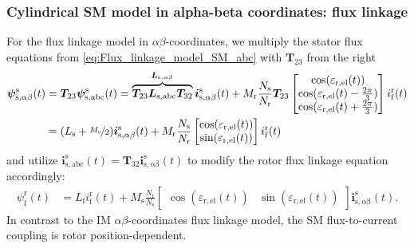 \begin{frame}
	\frametitle{Cylindrical SM model in alpha-beta coordinates: flux linkage}
	For the flux linkage model in $\alpha\beta$-coordinates, we multiply the stator flux equations from \eqref{eq:Flux_linkage_model_SM_abc} with $\bm{T}_{23}$ from the right
	\begin{equation}
		\begin{split}
			\bm{\psi}^\mathrm{s}_\mathrm{s,\alpha\beta}(t)  &= \bm{T}_{23} \bm{\psi}^\mathrm{s}_\mathrm{s,abc}(t) = \overbrace{\bm{T}_{23} \bm{L}_{\mathrm{s,abc}}\bm{T}_{32}}^{\bm{L}_{\mathrm{s},\alpha\beta}} \bm{i}^\mathrm{s}_{\mathrm{s},\alpha\beta}(t) +  M_{\mathrm{r}}\frac{N_\mathrm{s}}{N_\mathrm{r}} \bm{T}_{23}\begin{bmatrix}
				\cos(\varepsilon_\mathrm{r,el}(t))\\
				 \cos(\varepsilon_\mathrm{r,el}(t) - \frac{2\pi}{3})\\
				 \cos(\varepsilon_\mathrm{r,el}(t) + \frac{2\pi}{3}) 
			 \end{bmatrix} i^\mathrm{r}_{\mathrm{f}}(t)\\
			 & = (L_\mathrm{s} +\nicefrac{M_\mathrm{s}}{2}) \bm{i}^\mathrm{s}_{\mathrm{s},\alpha\beta}(t) + M_\mathrm{r}\frac{N_\mathrm{s}}{N_\mathrm{r}} \begin{bmatrix}\cos(\varepsilon_\mathrm{r,el}(t))\\ \sin(\varepsilon_\mathrm{r,el}(t))\end{bmatrix} i^\mathrm{r}_{\mathrm{f}}(t)
			\end{split}
	\end{equation}
	and utilize $\bm{i}^\mathrm{s}_\mathrm{s,abc}(t)=\bm{T}_{32} \bm{i}^\mathrm{s}_\mathrm{s,\alpha\beta}(t)$ to modify the rotor flux linkage equation accordingly:
	\begin{equation}
		\begin{split}
			\psi^\mathrm{r}_\mathrm{f}(t) &= L_\mathrm{f} i^\mathrm{r}_\mathrm{f}(t) + M_{\mathrm{s}}\frac{N_\mathrm{r}}{N_\mathrm{s}} \begin{bmatrix}
				\cos(\varepsilon_\mathrm{r,el}(t))  & \sin(\varepsilon_\mathrm{r,el}(t))
			 \end{bmatrix}\bm{i}^\mathrm{s}_\mathrm{s,\alpha\beta}(t).
		\end{split}
	\end{equation} 
	In contrast to the IM $\alpha\beta$-coordinates flux linkage model, the SM flux-to-current coupling is rotor position-dependent.
\end{frame}

